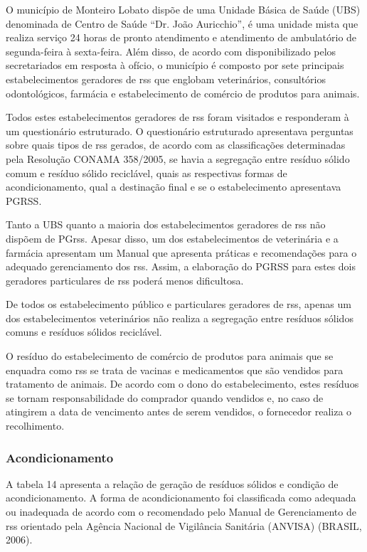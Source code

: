 	O município de Monteiro Lobato dispõe de uma Unidade Básica de Saúde (UBS) denominada de Centro de Saúde “Dr. João Auricchio”, é uma unidade mista que realiza serviço 24 horas de pronto atendimento e atendimento de ambulatório de segunda-feira à sexta-feira. Além disso, de acordo com disponibilizado pelos secretariados em resposta à ofício, o município é composto por sete principais estabelecimentos geradores de \gls{rss} que englobam veterinários, consultórios odontológicos, farmácia e estabelecimento de comércio de produtos para animais. 
	
	Todos estes estabelecimentos geradores de \gls{rss} foram visitados e responderam à um questionário estruturado. O questionário estruturado apresentava perguntas sobre quais tipos de \gls{rss} gerados, de acordo com as classificações determinadas pela Resolução CONAMA 358/2005, se havia a segregação entre resíduo sólido comum e resíduo sólido reciclável, quais as respectivas formas de acondicionamento, qual a destinação final e se o estabelecimento apresentava PGRSS.
	
	Tanto a UBS quanto a maioria dos estabelecimentos geradores de 
    \gls{rss} não dispõem de PG\gls{rss}. Apesar disso, um dos estabelecimentos de veterinária e a farmácia apresentam um Manual que apresenta práticas e recomendações para o adequado gerenciamento dos \gls{rss}. Assim, a elaboração do PGRSS para estes dois geradores particulares de \gls{rss} poderá menos dificultosa.
	
	De todos os estabelecimento público e particulares geradores de \gls{rss}, apenas um dos estabelecimentos veterinários não realiza a segregação entre resíduos sólidos comuns e resíduos sólidos reciclável.
	
	O resíduo do estabelecimento de comércio de produtos para animais que se enquadra como \gls{rss} se trata de vacinas e medicamentos que são vendidos para tratamento de animais. De acordo com o dono do estabelecimento, estes resíduos se tornam responsabilidade do comprador quando vendidos e, no caso de atingirem a data de vencimento antes de serem vendidos, o fornecedor realiza o recolhimento.
	
	\subsubsection{Acondicionamento}
	A tabela 14 apresenta a relação de geração de resíduos sólidos e condição de acondicionamento. A forma de acondicionamento foi classificada como adequada ou inadequada de acordo com o recomendado pelo Manual de Gerenciamento de \gls{rss} orientado pela Agência Nacional de Vigilância Sanitária (ANVISA) (BRASIL, 2006). 
	
